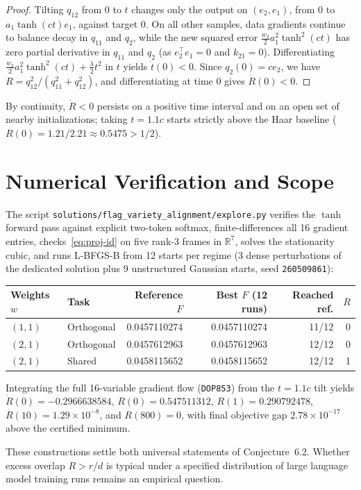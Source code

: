 \documentclass[11pt]{article}
\theoremstyle{plain}
\theoremstyle{definition}
\theoremstyle{remark}
\begin{document}
\begin{proof}
Tilting $q_{12}$ from $0$ to $t$ changes only the output on $(e_2, e_1)$, from $0$ to $a_1 \tanh(ct) e_1$, against target $0$. On all other samples, data gradients continue to balance decay in $q_{11}$ and $q_2$, while the new squared error $\frac{w_2}{2} a_1^2 \tanh^2(ct)$ has zero partial derivative in $q_{11}$ and $q_2$ (as $e_2^\top e_1 = 0$ and $k_{21} = 0$). Differentiating $\frac{w_2}{2} a_1^2 \tanh^2(ct) + \frac{\lambda}{2} t^2$ in $t$ yields $\dot{t}(0) < 0$. Since $q_2(0) = c e_2$, we have $R = q_{12}^2/(q_{11}^2 + q_{12}^2)$, and differentiating at time $0$ gives $\dot{R}(0) < 0$.
\end{proof}

By continuity, $\dot{R} < 0$ persists on a positive time interval and on an open set of nearby initializations; taking $t = 1.1c$ starts strictly above the Haar baseline ($R(0) = 1.21/2.21 \approx 0.5475 > 1/2$).

\section{Numerical Verification and Scope}

The script \texttt{solutions/flag\_variety\_alignment/explore.py} verifies the $\tanh$ forward pass against explicit two-token softmax, finite-differences all 16 gradient entries, checks~\eqref{eq:proj-id} on five rank-3 frames in $\mathbb{R}^7$, solves the stationarity cubic, and runs L-BFGS-B from 12 starts per regime (3 dense perturbations of the dedicated solution plus 9 unstructured Gaussian starts, seed \texttt{260509861}):

\begin{table}[h]\centering\small
\begin{tabular}{llrrrr}
\toprule
Weights $w$ & Task & Reference $F$ & Best $F$ (12 runs) & Reached ref. & $R$ \\
\midrule
$(1, 1)$ & Orthogonal & 0.0457110274 & 0.0457110274 & 11/12 & 0 \\
$(2, 1)$ & Orthogonal & 0.0457612963 & 0.0457612963 & 12/12 & 0 \\
$(2, 1)$ & Shared     & 0.0458115652 & 0.0458115652 & 12/12 & 1 \\
\bottomrule
\end{tabular}
\end{table}

Integrating the full 16-variable gradient flow (\texttt{DOP853}) from the $t = 1.1c$ tilt yields $\dot{R}(0) = -0.2966638584$, $R(0) = 0.547511312$, $R(1) = 0.290792478$, $R(10) = 1.29 \times 10^{-8}$, and $R(800) = 0$, with final objective gap $2.78 \times 10^{-17}$ above the certified minimum.

These constructions settle both universal statements of Conjecture~6.2. Whether excess overlap $R > r/d$ is typical under a specified distribution of large language model training runs remains an empirical question.
\end{document}
